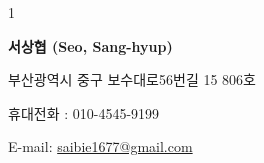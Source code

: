 \documentclass[11pt]{article} %
\def\WithKorean{0}
\begin{document}
\newcommand\profile{
	{\LARGE\bfseries 서상협 (Seo, Sang-hyup)} %
	\bigskip\bigskip\medskip %
	
	부산광역시 중구 보수대로56번길 15 806호 %
	\medskip %
	
	휴대전화 : 010-4545-9199 %
	\medskip %
	
	E-mail: \href{mailto:saibie1677@gmail.com}{saibie1677@gmail.com}\\ %
}

\newcommand\profileeng{
	{\LARGE\bfseries Seo, Sang-hyup (서상협)} %
	\bigskip\bigskip\medskip %
	
	48973, No.806, 15, Bosu-daero 56beon-gil, Jung-gu, Busan, Republic of Korea %
	\medskip %
	
	Mobile : 010-4545-9199 %
	\medskip %
	
	E-mail: \href{mailto:saibie1677@gmail.com}{saibie1677@gmail.com}\\ %
}





%

\if\WithKorean1
\profile

%
\end{document}
